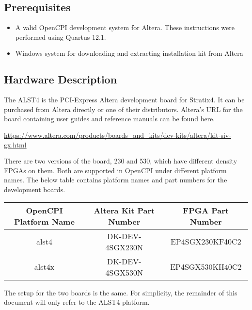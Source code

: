\subsection*{Prerequisites}
\begin{itemize}
\item A valid OpenCPI development system for Altera. These instructions were performed using Quartus 12.1.
\item Windows system for downloading and extracting installation kit from Altera
\end{itemize}
\subsection*{Hardware Description}
 The ALST4 is the PCI-Express Altera development board for Stratix4. It can be purchased from Altera directly or one of their distributors. Altera's URL for the board containing user guides and reference manuals can be found here.\par\bigskip
​\url{https://www.altera.com/products/boards\_and\_kits/dev-kits/altera/kit-siv-gx.html}\par\bigskip
\noindent There are two versions of the board, 230 and 530, which have different density FPGAs on them. Both are supported in OpenCPI under different platform names. The below table contains platform names and part numbers for the development boards.\par\smallskip
\begin{tabular}{|c|c|c|}
\hline
\rowcolor{blue}
OpenCPI Platform Name & Altera Kit Part Number & FPGA Part Number \\
\hline
alst4 &  DK-DEV-4SGX230N & EP4SGX230KF40C2 \\
\hline
alst4x &  DK-DEV-4SGX530N & EP4SGX530KH40C2 \\
\hline
\end{tabular}\par\bigskip
\noindent The setup for the two boards is the same. For simplicity, the remainder of this document will only refer to the ALST4 platform.
